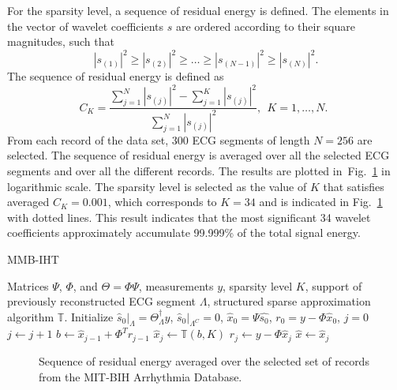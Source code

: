 \documentclass[journal]{IEEEtran}
\begin{document}
For the sparsity level, a sequence of residual energy is defined. The elements in the vector of wavelet coefficients $s$ are ordered according to their square magnitudes, such that
\begin{equation}\label{BPD180687}
|s_{(1)}|^2 \geq |s_{(2)}|^2 \geq \ldots \geq |s_{(N-1)}|^2 \geq |s_{(N)}|^2.
\end{equation}
The sequence of residual energy is defined as
\begin{equation}\label{BPD180688}
C_K=\frac{\sum\limits_{j=1}^{N} |s_{(j)}|^2-\sum\limits_{j=1}^{K} |s_{(j)}|^2}{\sum\limits_{j=1}^{N} |s_{(j)}|^2},~~K=1, \ldots, N.~~
\end{equation}
From each record of the data set, 300 ECG segments of length $N=256$ are selected. The sequence of residual energy is averaged over all the selected ECG segments and over all the different records. The results are plotted in~Fig.~\ref{fig:5} in logarithmic scale. The sparsity level is selected as the value of $K$ that satisfies averaged $C_K=0.001$, which corresponds to $K=34$ and is indicated in Fig.~\ref{fig:5} with dotted lines. This result indicates that the most significant 34 wavelet coefficients approximately accumulate 99.999\% of the total signal energy.
\label{ssec:CSPKSSSS}
\begin{algorithm}[t]
\caption{MMB-IHT}\label{alg:alg2}
\begin{algorithmic}[1]
\REQUIRE  Matrices $\Psi$, $\Phi$, and $\Theta=\Phi\Psi$, measurements $y$, sparsity level $K$, support of previously reconstructed ECG segment $\Lambda$, structured sparse approximation algorithm $\mathbb{T}$.
\STATE Initialize $\hat{s}_0|_{\Lambda}=\Theta_{\Lambda}^\dagger y$, $\hat{s}_0|_{\Lambda^C}=0$, $\hat{x}_0=\Psi \hat{s_0}$, $r_0=y-\Phi\hat{x}_0$, $j=0$
\STATE $j\leftarrow j+1$
\STATE $b\leftarrow \hat{x}_{j-1}+\Phi^T r_{j-1}$
\STATE $\hat{x}_j\leftarrow\mathbb{T}(b,K)$
\STATE $r_j\leftarrow y-\Phi\hat{x}_j$
\ENDWHILE
\RETURN $\hat{x} \leftarrow \hat{x}_j$
\end{algorithmic}
\end{algorithm}

\begin{figure}[t]
\caption{Sequence of residual energy averaged over the selected set of records from the MIT-BIH Arrhythmia Database.} \label{fig:5}
\end{figure}
\end{document}
